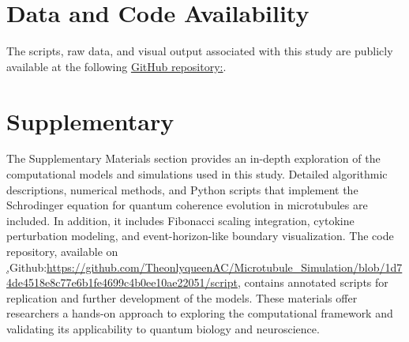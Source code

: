 
\section{Data and Code Availability}
The scripts, raw data, and visual output associated with this study are publicly available at
the following \href{https://github.com/TheonlyqueenAC/Microtubule\_Simulation}{GitHub repository:}.

\section{Supplementary}
The Supplementary Materials section provides an in-depth exploration of the computational models and simulations used in this study. Detailed algorithmic descriptions, numerical methods, and Python scripts that implement the Schrodinger equation for quantum coherence evolution in microtubules are included. In addition, it includes Fibonacci scaling integration, cytokine perturbation modeling, and event-horizon-like boundary visualization. The code repository, available on \href{https://github.com/TheonlyqueenAC/Microtubule_Simulation/blob/1d74de4518e8c77e6b1fe4699c4b0ee10ae22051/script},{Github}:\url{https://github.com/TheonlyqueenAC/Microtubule_Simulation/blob/1d74de4518e8c77e6b1fe4699c4b0ee10ae22051/script}, contains annotated scripts for replication and further development of the models. These materials offer researchers a hands-on approach to exploring the computational framework and validating its applicability to quantum biology and neuroscience.


